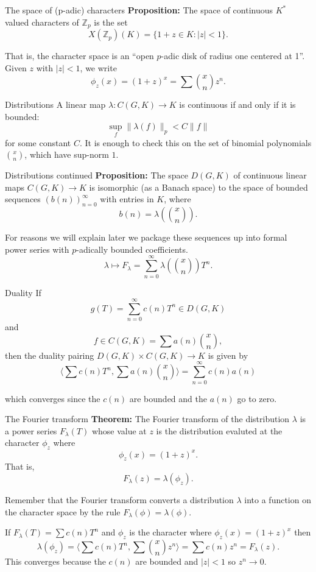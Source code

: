 \documentclass[
  ignorenonframetext,
]{beamer}
\begin{document}
\begin{frame}{The space of (p-adic) characters}
\protect\hypertarget{the-space-of-p-adic-characters}{}
\textbf{Proposition:} The space of continuous \(K^{*}\) valued
characters of \(\mathbb{Z}_p\) is the set \[
X(\mathbb{Z}_p)(K)=\{1+z\in K: |z|<1\}.
\]

That is, the character space is an ``open \(p\)-adic disk of radius one
centered at 1''. Given \(z\) with \(|z|<1\), we write \[
\phi_z(x)=(1+z)^x=\sum \binom{x}{n}z^n.
\]
\end{frame}

\begin{frame}{Distributions}
\protect\hypertarget{distributions-1}{}
A linear map \(\lambda:C(G,K)\to K\) is continuous if and only if it is
bounded: \[
\sup_{f} \|\lambda(f)\|_p <C\|f\|
\] for some constant \(C\). It is enough to check this on the set of
binomial polynomials \(\binom{x}{n}\), which have sup-norm \(1\).
\end{frame}

\begin{frame}{Distributions continued}
\protect\hypertarget{distributions-continued}{}
\textbf{Proposition:} The space \(D(G,K)\) of continuous linear maps
\(C(G,K)\to K\) is isomorphic (as a Banach space) to the space of
bounded sequences \((b(n))_{n=0}^{\infty}\) with entries in \(K\), where
\[
b(n) = \lambda(\binom{x}{n}).
\]

For reasons we will explain later we package these sequences up into
formal power series with \(p\)-adically bounded coefficients. \[
\lambda \mapsto F_{\lambda}=\sum_{n=0}^{\infty} \lambda(\binom{x}{n})T^{n}.
\]
\end{frame}

\begin{frame}{Duality}
\protect\hypertarget{duality}{}
If \[g(T)=\sum_{n=0}^{\infty} c(n)T^{n}\in D(G,K)\] and
\[f\in C(G,K)=\sum a(n)\binom{x}{n},\] then the duality pairing
\(D(G,K)\times C(G,K)\to K\) is given by \[
\langle \sum c(n)T^n,\sum a(n)\binom{x}{n}\rangle =\sum_{n=0}^{\infty} c(n)a(n)
\]

which converges since the \(c(n)\) are bounded and the \(a(n)\) go to
zero.
\end{frame}

\begin{frame}{The Fourier transform}
\protect\hypertarget{the-fourier-transform}{}
\textbf{Theorem:} The Fourier transform of the distribution \(\lambda\)
is a power series \(F_{\lambda}(T)\) whose value at \(z\) is the
distribution evaluted at the character \(\phi_z\) where \[
\phi_{z}(x)=(1+z)^{x}.
\] That is, \[
F_{\lambda}(z) = \lambda(\phi_{z}).
\]

Remember that the Fourier transform converts a distribution \(\lambda\)
into a function on the character space by the rule
\(F_{\lambda}(\phi) = \lambda(\phi)\).

If \(F_{\lambda}(T)=\sum c(n)T^{n}\) and \(\phi_z\) is the character
where \(\phi_z(x)=(1+z)^x\) then \[
\lambda(\phi_z) = \langle \sum c(n)T^n, \sum \binom{x}{n}z^n\rangle = \sum c(n)z^n = F_{\lambda}(z).
\] This converges because the \(c(n)\) are bounded and \(|z|<1\) so
\(z^n\to 0\).
\end{frame}
\end{document}
